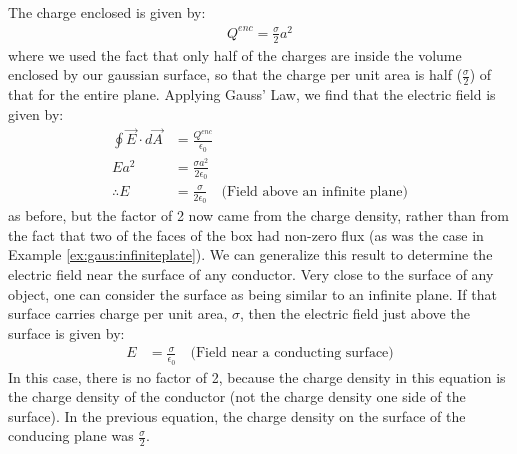 The charge enclosed is given by:
\begin{align*}
Q^{enc}=\frac{\sigma}{2}a^2
\end{align*}
where we used the fact that only half of the charges are inside the volume enclosed by our gaussian surface, so that the charge per unit area is half ($\frac{\sigma}{2}$) of that for the entire plane. Applying Gauss' Law, we find that the electric field is given by:
\begin{align*}
\oint \vec E\cdot d\vec A&=\frac{Q^{enc}}{\epsilon_0} \\
Ea^2&= \frac{\sigma a^2}{2\epsilon_0}\\
\therefore E&= \frac{\sigma}{2\epsilon_0}\quad \text{(Field above an infinite plane)}
\end{align*}
as before, but the factor of 2 now came from the charge density, rather than from the fact that two of the faces of the box had non-zero flux (as was the case in Example \ref{ex:gaus:infiniteplate}). We can generalize this result to determine the electric field near the surface of any conductor. Very close to the surface of any object, one can consider the surface as being similar to an infinite plane. If that surface carries charge per unit area, $\sigma$, then the electric field just above the surface is given by:
\begin{align*}
 E&= \frac{\sigma}{\epsilon_0} \quad \text{(Field near a conducting surface)}
\end{align*}
In this case, there is no factor of 2, because the charge density in this equation is the charge density of the conductor (not the charge density one side of the surface). In the previous equation, the charge density on the surface of the conducing plane was $\frac{\sigma}{2}$.

